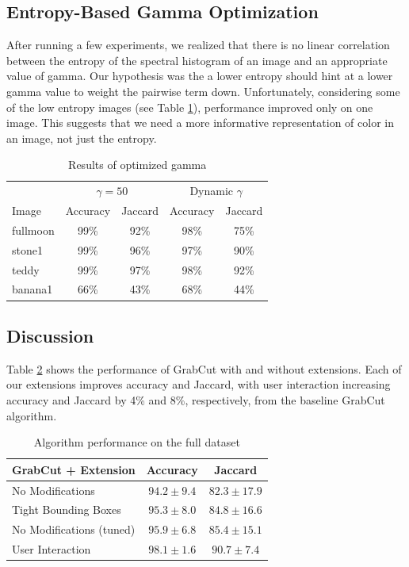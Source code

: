 \documentclass[10pt,twocolumn,letterpaper]{article}
\begin{document}
\subsection{Entropy-Based Gamma Optimization}
After running a few experiments, we realized that there is no linear correlation between the entropy of the spectral histogram of an image and an appropriate value of gamma. Our hypothesis was the a lower entropy should hint at a lower gamma value to weight the pairwise term down. Unfortunately, considering some of the low entropy images (see Table \ref{table:gamma_optimization}), performance improved only on one image. This suggests that we need a more informative representation of color in an image, not just the entropy.
\begin{table}[t]
\centering
\caption{Results of optimized gamma}
\begin{tabular}{|l|cc|cc|}
\hline
 & \multicolumn{2}{c|}{$\gamma=50$} & \multicolumn{2}{c|}{Dynamic $\gamma$} \\ 
Image & Accuracy & Jaccard & Accuracy & Jaccard \\ \hline
fullmoon & 99\% & 92\% & 98\% & 75\% \\
stone1   & 99\% & 96\% & 97\% & 90\% \\
teddy    & 99\% & 97\% & 98\% & 92\% \\ 
banana1  & 66\% & 43\% & 68\% & 44\% \\ \hline
\end{tabular}
\label{table:gamma_optimization}
\end{table}

\subsection{Discussion}
Table \ref{table:comparison} shows the performance of GrabCut with and without extensions. Each of our extensions improves accuracy and Jaccard, with user interaction increasing accuracy and Jaccard by 4\% and 8\%, respectively, from the baseline GrabCut algorithm.

\begin{table}[t]
\centering
\caption{Algorithm performance on the full dataset}
\begin{tabular}{|l|cc|}
\hline
GrabCut + Extension & Accuracy & Jaccard \\ \hline
No Modifications & $94.2 \pm 9.4$ & $82.3 \pm 17.9$ \\
Tight Bounding Boxes & $95.3 \pm 8.0$ & $84.8 \pm 16.6$ \\
No Modifications (tuned) & $95.9 \pm 6.8$ & $85.4 \pm 15.1$ \\ 
User Interaction & $98.1 \pm 1.6$ & $90.7 \pm 7.4$ \\ \hline
\end{tabular}
\label{table:comparison}
\end{table}
\end{document}
